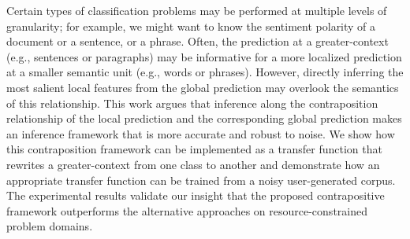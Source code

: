 Certain types of classification problems may be performed at multiple levels of granularity; for example, we might want to know the sentiment polarity of a document or a sentence, or a phrase. Often, the prediction at a greater-context (e.g., sentences or paragraphs) may be informative for a more localized prediction at a smaller semantic unit (e.g., words or phrases). However, directly inferring the most salient local features from the global prediction may overlook the semantics of this relationship. This work argues that inference along the contraposition relationship of the local prediction and the corresponding global prediction makes an inference framework that is more accurate and robust to noise. We show how this contraposition framework can be implemented as a transfer function that rewrites a greater-context from one class to another and demonstrate how an appropriate transfer function can be trained from a noisy user-generated corpus. The experimental results validate our insight that the proposed contrapositive framework outperforms the alternative approaches on resource-constrained problem domains.
